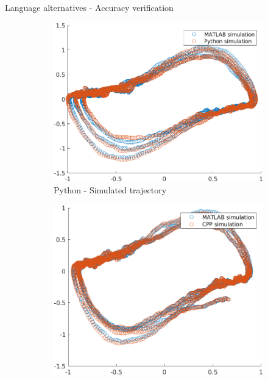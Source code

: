 \documentclass{beamer}
\begin{document}
\begin{frame}{Language alternatives - Accuracy verification}
    \begin{figure}
        \centering
        \begin{subfigure}[b]{0.3\textwidth}
            \centering
            \includegraphics[width=\textwidth]{Python_Sim.png}
            \caption{Python - Simulated trajectory}
            \label{fig:sim_python}
        \end{subfigure}
        \hfill
        \begin{subfigure}[b]{0.3\textwidth}
            \centering
            \includegraphics[width=\textwidth]{Cpp_Sim.png}

\end{subfigure}
\end{figure}
\end{frame}
\end{document}
